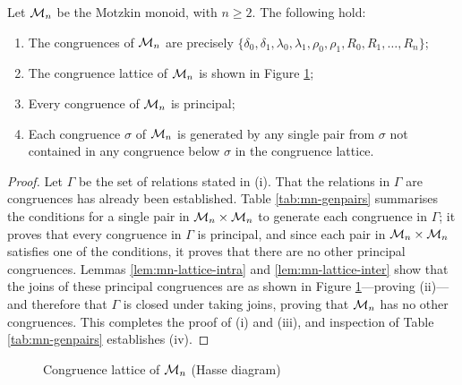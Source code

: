 \begin{theorem}
  \label{thm:mn-congs}
  Let $\mathcal{M}_n$ be the Motzkin monoid, with $n \geq 2$.  The following hold:
  \begin{enumerate}[\rm(i)]
  \item The congruences of $\mathcal{M}_n$ are precisely
    $\{\delta_0, \delta_1, \lambda_0, \lambda_1, \rho_0, \rho_1, R_0, R_1,
    \ldots, R_n\}$;
  \item The congruence lattice of $\mathcal{M}_n$ is shown in Figure
    \ref{fig:mn-cong-lattice};
  \item Every congruence of $\mathcal{M}_n$ is principal;
  \item Each congruence $\sigma$ of $\mathcal{M}_n$ is generated by any single pair
    from $\sigma$ not contained in any congruence below $\sigma$ in the
    congruence lattice.
  \end{enumerate}
  \begin{proof}
    Let $\Gamma$ be the set of relations stated in (i).  That the relations in
    $\Gamma$ are congruences has already been established.  Table
    \ref{tab:mn-genpairs} summarises the conditions for a single pair in
    $\mathcal{M}_n \times \mathcal{M}_n$ to generate each congruence in $\Gamma$; it proves
    that every congruence in $\Gamma$ is principal, and since each pair in
    $\mathcal{M}_n \times \mathcal{M}_n$ satisfies one of the conditions, it proves that there
    are no other principal congruences.  Lemmas \ref{lem:mn-lattice-intra} and
    \ref{lem:mn-lattice-inter} show that the joins of these principal
    congruences are as shown in Figure \ref{fig:mn-cong-lattice}---proving
    (ii)---and therefore that $\Gamma$ is closed under taking joins, proving
    that $\mathcal{M}_n$ has no other congruences.  This completes the proof of (i) and
    (iii), and inspection of Table \ref{tab:mn-genpairs} establishes (iv).
  \end{proof}
\end{theorem}

\begin{figure}[h]
  \centering
  \caption{Congruence lattice of $\mathcal{M}_n$ (Hasse diagram)}
  \label{fig:mn-cong-lattice}
\end{figure}

